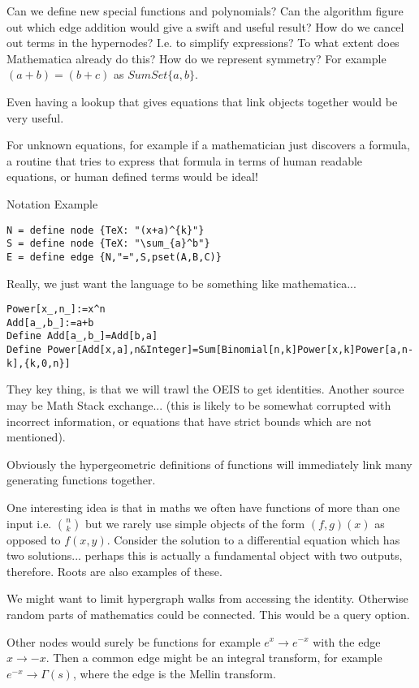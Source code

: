 \documentclass{article}
\begin{document}
Can we define new special functions and polynomials? Can the algorithm figure out which edge addition would give a swift and useful result? How do we cancel out terms in the hypernodes? I.e. to simplify expressions? To what extent does Mathematica already do this? How do we represent symmetry? For example $(a+b)=(b+c)$ as $SumSet\{a,b\}$.

Even having a lookup that gives equations that link objects together would be very useful.

For unknown equations, for example if a mathematician just discovers a formula, a routine that tries to express that formula in terms of human readable equations, or human defined terms would be ideal!

Notation Example
\begin{verbatim}
N = define node {TeX: "(x+a)^{k}"}
S = define node {TeX: "\sum_{a}^b"}
E = define edge {N,"=",S,pset(A,B,C)}
\end{verbatim}

Really, we just want the language to be something like mathematica...
\begin{verbatim}
Power[x_,n_]:=x^n
Add[a_,b_]:=a+b
Define Add[a_,b_]=Add[b,a]
Define Power[Add[x,a],n&Integer]=Sum[Binomial[n,k]Power[x,k]Power[a,n-k],{k,0,n}] 
\end{verbatim}

They key thing, is that we will trawl the OEIS to get identities. Another source may be Math Stack exchange... (this is likely to be somewhat corrupted with incorrect information, or equations that have strict bounds which are not mentioned).

Obviously the hypergeometric definitions of functions will immediately link many generating functions together.

One interesting idea is that in maths we often have functions of more than one input i.e. $\binom{n}{k}$ but we rarely use simple objects of the form $(f,g)(x)$ as opposed to $f(x,y)$. Consider the solution to a differential equation which has two solutions... perhaps this is actually a fundamental object with two outputs, therefore. Roots are also examples of these.

We might want to limit hypergraph walks from accessing the identity. Otherwise random parts of mathematics could be connected. This would be a query option.

Other nodes would surely be functions for example $e^x \to e^{-x}$ with the edge $x \to -x$. Then a common edge might be an integral transform, for example $e^{-x} \to \Gamma(s)$, where the edge is the Mellin transform. 
\end{document}
